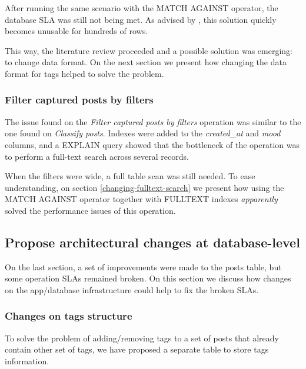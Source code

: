 After running the same scenario with the MATCH AGAINST operator, the database SLA was still not being met. As advised by \cite{stackoverflowmatch}, this solution quickly becomes unusable for hundreds of rows. 

This way, the literature review proceeded and a possible solution was emerging: to change data format. On the next section we present how changing the data format for tags helped to solve the problem.  



\subsubsection{Filter captured posts by filters}
The issue found on the \textit{Filter captured posts by filters} operation was similar to the one found on \textit{Classify posts}. Indexes were added to the \textit{created\_at} and \textit{mood} columns, and a EXPLAIN query showed that the bottleneck of the operation was to perform a full-text search across several records. 

When the filters were wide, a full table scan was still needed. To ease  understanding, on section \ref{changing-fulltext-search} we present how using the MATCH AGAINST operator together with FULLTEXT indexes \textit{apparently} solved the performance issues of this operation. 













\clearpage
\subsection{Propose architectural changes at database-level}

On the last section, a set of improvements were made to the posts table, but some operation SLAs remained broken. On this section we discuss how changes on the app/database infrastructure could help to fix the broken SLAs.

\subsubsection{Changes on tags structure}
To solve the problem of adding/removing tags to a set of posts that already contain other set of tags, we have proposed a separate table to store tags information. 

